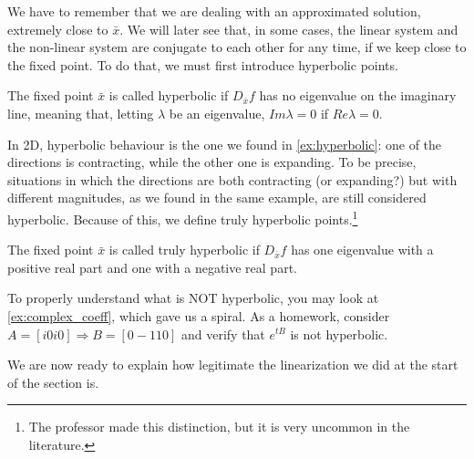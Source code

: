 We have to remember that we are dealing with an approximated solution, extremely close to $\bar{x}$. We will later see that, in some cases, the linear system and the non-linear system are conjugate to each other for any time, if we keep close to the fixed point. To do that, we must first introduce hyperbolic points.

\begin{definition}
    The fixed point $\bar{x}$ is called hyperbolic if $D_{\bar{x}}f$ has no eigenvalue on the imaginary line, meaning that, letting $\lambda$ be an eigenvalue, $Im \lambda=0$ if $Re \lambda=0$.
\end{definition}

In 2D, hyperbolic behaviour is the one we found in \autoref{ex:hyperbolic}: one of the directions is contracting, while the other one is expanding. To be precise, situations in which the directions are both contracting (or expanding?) but with different magnitudes, as we found in the same example, are still considered hyperbolic. Because of this, we define truly hyperbolic points.\footnote{The professor made this distinction, but it is very uncommon in the literature.}

\begin{definition}
    The fixed point $\bar{x}$ is called truly hyperbolic if $D_{\bar{x}}f$ has one eigenvalue with a positive real part and one with a negative real part.
\end{definition}

To properly understand what is NOT hyperbolic, you may look at \autoref{ex:complex_coeff}, which gave us a spiral. As a homework, consider $A=[i 0 i 0]\Rightarrow B=[0 -1 1 0]$ and verify that $e^{tB}$ is not hyperbolic. 

We are now ready to explain how legitimate the linearization we did at the start of the section is.

